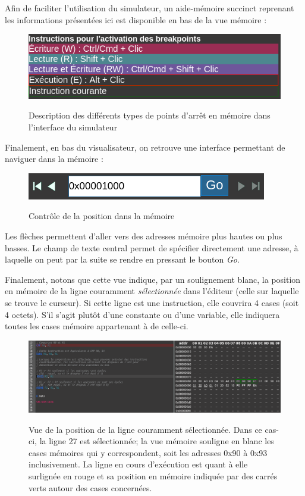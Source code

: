 \documentclass{tufte-handout}
\begin{document}
Afin de faciliter l'utilisation du simulateur, un aide-mémoire succinct reprenant les informations présentées ici est disponible en bas de la vue mémoire :
\begin{figure}[h!]
\raggedleft
\includegraphics[width=0.6\linewidth]{pics/memoire_reminder.png}
\label{f:memoirerem}
\caption{Description des différents types de points d'arrêt en mémoire dans l'interface du simulateur}
\end{figure}

Finalement, en bas du visualisateur, on retrouve une interface permettant de naviguer dans la mémoire :
\begin{figure}[h!]
\raggedleft
\includegraphics[width=0.6\linewidth]{pics/memoire_goto.png}
\label{f:memoiregoto}
\caption{Contrôle de la position dans la mémoire}
\end{figure}

 Les flèches permettent d'aller vers des adresses mémoire plus hautes ou plus basses. Le champ de texte central permet de spécifier directement une adresse, à laquelle on peut par la suite se rendre en pressant le bouton \textit{Go}.
 
Finalement, notons que cette vue indique, par un soulignement blanc, la position en mémoire de la ligne couramment \textit{sélectionnée} dans l'éditeur (celle sur laquelle se trouve le curseur). Si cette ligne est une instruction, elle couvrira 4 cases (soit 4 octets). S'il s'agit plutôt d'une constante ou d'une variable, elle indiquera toutes les cases mémoire appartenant à de celle-ci. 
 \begin{figure}[h!]
\raggedleft
\includegraphics[width=0.98\linewidth]{pics/memoire_courant.png}
\label{f:memoirecurrent}
\caption{Vue de la position de la ligne couramment sélectionnée. Dans ce cas-ci, la ligne 27 est sélectionnée; la vue mémoire souligne en blanc les cases mémoires qui y correspondent, soit les adresses 0x90 à 0x93 inclusivement. La ligne en cours d'exécution est quant à elle surlignée en rouge et sa position en mémoire indiquée par des carrés verts autour des cases concernées.}
\end{figure}
\end{document}
